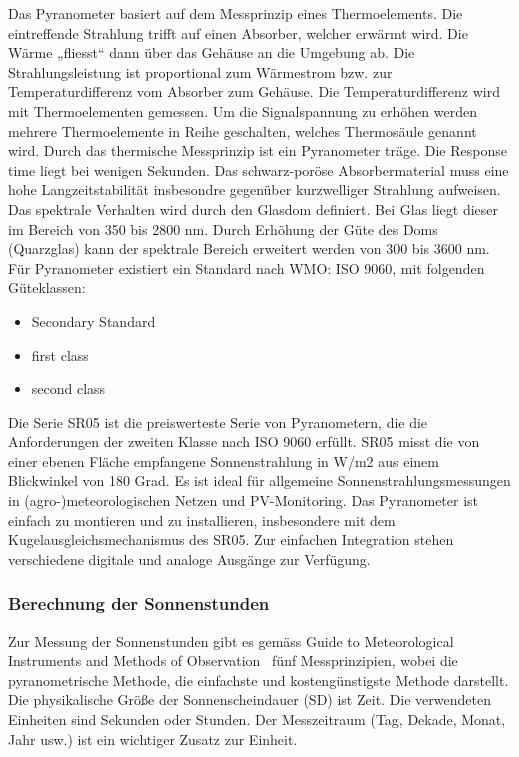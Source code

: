 
Das Pyranometer basiert auf dem Messprinzip eines Thermoelements. Die eintreffende Strahlung trifft auf einen Absorber, welcher erwärmt wird. Die Wärme „fliesst“ dann über das Gehäuse an die Umgebung ab. Die Strahlungsleistung ist proportional zum Wärmestrom bzw. zur Temperaturdifferenz vom Absorber zum Gehäuse. Die Temperaturdifferenz wird mit Thermoelementen gemessen. Um die Signalspannung zu erhöhen werden mehrere Thermoelemente in Reihe geschalten, welches Thermosäule genannt wird. Durch das thermische Messprinzip ist ein Pyranometer träge. Die Response time liegt bei wenigen Sekunden. Das schwarz-poröse Absorbermaterial muss eine hohe Langzeitstabilität insbesondre gegenüber kurzwelliger Strahlung aufweisen. Das spektrale Verhalten wird durch den Glasdom definiert. Bei Glas liegt dieser im Bereich von 350 bis 2800 nm. Durch Erhöhung der Güte des Doms (Quarzglas) kann der spektrale Bereich erweitert werden von 300 bis 3600 nm. Für Pyranometer existiert ein Standard nach WMO: ISO 9060, mit folgenden Güteklassen:


\begin{itemize}
\item Secondary Standard
\item first class
\item second class
\end{itemize}


Die Serie SR05 ist die preiswerteste Serie von Pyranometern, die die Anforderungen der zweiten Klasse nach ISO 9060 erfüllt. SR05 misst die von einer ebenen Fläche empfangene Sonnenstrahlung in W/m2 aus einem Blickwinkel von 180 Grad. Es ist ideal für allgemeine Sonnenstrahlungsmessungen in (agro-)meteorologischen Netzen und PV-Monitoring. Das Pyranometer ist einfach zu montieren und zu installieren, insbesondere mit dem Kugelausgleichsmechanismus des SR05. Zur einfachen Integration stehen verschiedene digitale und analoge Ausgänge zur Verfügung.


\subsubsection{Berechnung der Sonnenstunden}
Zur Messung der Sonnenstunden gibt es gemäss  \flqq Guide to Meteorological Instruments and Methods of Observation\frqq ~\cite{WMO2014Gtmi}  fünf Messprinzipien, wobei die pyranometrische Methode, die einfachste und kostengünstigste Methode darstellt. Die physikalische Größe der Sonnenscheindauer (SD) ist Zeit. Die verwendeten Einheiten sind Sekunden oder Stunden.
Der Messzeitraum (Tag, Dekade, Monat, Jahr usw.) ist ein wichtiger Zusatz zur Einheit.


